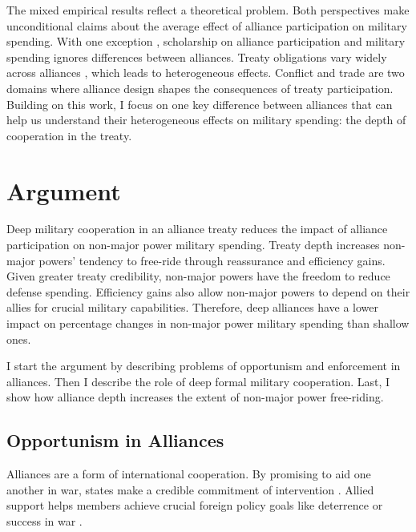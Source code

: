 \documentclass[12pt]{article}
\begin{document}
The mixed empirical results reflect a theoretical problem. 
Both perspectives make unconditional claims about the average effect of alliance participation on military spending.  
With one exception \citep{DigiuseppePoast2016}, scholarship on alliance participation and military spending ignores differences between alliances.
Treaty obligations vary widely across alliances \citep{Leedsetal2002}, which leads to heterogeneous effects. 
Conflict \citep{Leeds2003, Benson2012} and trade \citep{Long2003, LongLeeds2006} are two domains where alliance design shapes the consequences of treaty participation. 
Building on this work, I focus on one key difference between alliances that can help us understand their heterogeneous effects on military spending: the depth of cooperation in the treaty.



\section{Argument}

Deep military cooperation in an alliance treaty reduces the impact of alliance participation on non-major power military spending.
Treaty depth increases non-major powers' tendency to free-ride through reassurance and efficiency gains. 
Given greater treaty credibility, non-major powers have the freedom to reduce defense spending.
Efficiency gains also allow non-major powers to depend on their allies for crucial military capabilities.   
Therefore, deep alliances have a lower impact on percentage changes in non-major power military spending than shallow ones. 


I start the argument by describing problems of opportunism and enforcement in alliances. 
Then I describe the role of deep formal military cooperation. 
Last, I show how alliance depth increases the extent of non-major power free-riding. 


\subsection{Opportunism in Alliances}

Alliances are a form of international cooperation. 
By promising to aid one another in war, states make a credible commitment of intervention \citep{Fearon1997, Morrow2000}. 
Allied support helps members achieve crucial foreign policy goals like deterrence or success in war \citep{Walt1990, Snyder1997}. 
\end{document}
